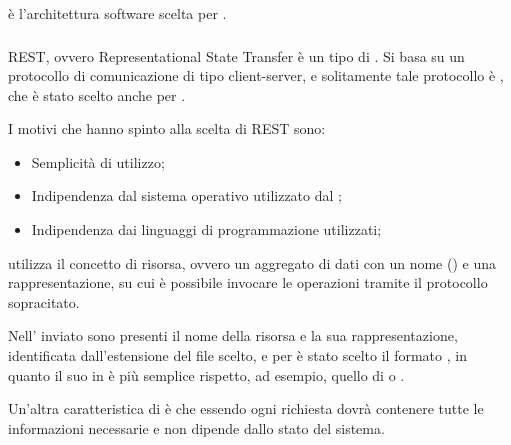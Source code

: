  è l'architettura software scelta per \ProjectName.

\subsubsection{}

REST, ovvero Representational State Transfer è un tipo di . Si basa su un protocollo di comunicazione  di tipo client-server, e solitamente tale protocollo è , che è stato scelto anche per \ProjectName.

I motivi che hanno spinto alla scelta di REST sono:
\begin{itemize}
\item Semplicità di utilizzo;
\item Indipendenza dal sistema operativo utilizzato dal ;
\item Indipendenza dai linguaggi di programmazione utilizzati;
\end{itemize}

 utilizza il concetto di risorsa, ovvero un aggregato di dati con un nome () e una rappresentazione, su cui è possibile invocare le operazioni  tramite il protocollo sopracitato.

Nell' inviato sono presenti il nome della risorsa e la sua rappresentazione, identificata dall'estensione del file scelto, e per \ProjectName è stato scelto il formato , in quanto il suo  in  è più semplice rispetto, ad esempio, quello di  o .

Un'altra caratteristica di  è che essendo  ogni richiesta dovrà contenere tutte le informazioni necessarie e non dipende dallo stato del sistema.
